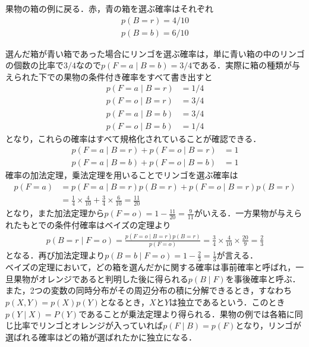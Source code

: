 \documentclass[a4j,11pt]{article}
\begin{document}
果物の箱の例に戻る．赤，青の箱を選ぶ確率はそれぞれ
\begin{align}
p(B = r) = 4/10\\
p(B = b) = 6/10
\end{align}

選んだ箱が青い箱であった場合にリンゴを選ぶ確率は，単に青い箱の中のリンゴの個数の比率で$3/4$なので$p(F = a\mid B = b) = 3/4$である．実際に箱の種類が与えられた下での果物の条件付き確率をすべて書き出すと
\begin{align}
p(F = a\mid B = r) &= 1/4\\
p(F = o\mid B = r) &= 3/4\\
p(F = a\mid B = b) &= 3/4\\
p(F = o\mid B = b) &= 1/4
\end{align}
となり，これらの確率はすべて規格化されていることが確認できる．
\begin{align}
p(F = a\mid B = r) + p(F = o\mid B = r) &= 1\\
p(F = a\mid B = b) + p(F = o\mid B = b) &= 1
\end{align}
確率の加法定理，乗法定理を用いることでリンゴを選ぶ確率は
\begin{equation}
\begin{split}
p(F = a)&=p(F = a\mid B = r)p(B = r) + p(F = o\mid B = r)p(B = r)\\
&=\frac{1}{4} \times \frac{4}{10} + \frac{3}{4}\times \frac{6}{10} = \frac{11}{20}
\end{split}
\end{equation}
となり，また加法定理から$p(F = o) =\displaystyle 1-\frac{11}{20} = \frac{9}{11}$がいえる．一方果物が与えられたもとでの条件付確率はベイズの定理より
\begin{align}
p(B = r\mid F = o) = \frac{p(F = o\mid B = r)p(B = r)}{p(F = o)} = \frac{3}{4}\times\frac{4}{10}\times \frac{20}{9}= \frac{2}{3}
\end{align}
となる．再び加法定理より$p(B = b\mid F = o) = 1-\frac{2}{3} = \frac{1}{3}$が言える．\\

ベイズの定理において，どの箱を選んだかに関する確率は事前確率と呼ばれ，一旦果物がオレンジであると判明した後に得られる$p(B\mid F)$を事後確率と呼ぶ．\\
また，2つの変数の同時分布がその周辺分布の積に分解できるとき，すなわち$p(X,Y) = p(X)p(Y)$となるとき，$X$と$Y$は独立であるという．このとき$p(Y\mid X) = P(Y)$であることが乗法定理より得られる．果物の例では各箱に同じ比率でリンゴとオレンジが入っていれば$p(F\mid B) = p(F)$となり，リンゴが選ばれる確率はどの箱が選ばれたかに独立になる．\\
\end{document}
